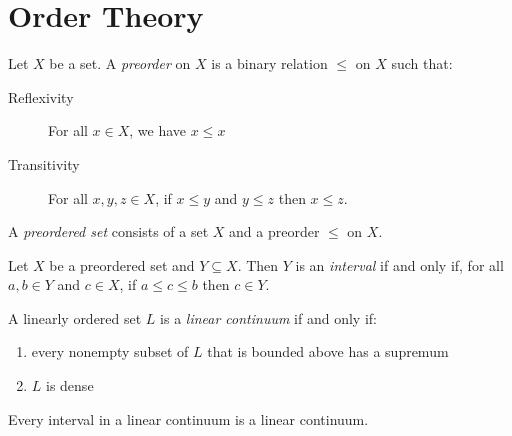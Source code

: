 \section{Order Theory}

\begin{definition}[Preorder]
    Let $X$ be a set. A \emph{preorder} on $X$ is a binary relation $\leq$ on $X$ such that:
    \begin{description}
        \item[Reflexivity] For all $x \in X$, we have $x \leq x$
        \item[Transitivity] For all $x, y, z \in X$, if $x \leq y$ and $y \leq z$ then $x \leq z$.  
    \end{description}
\end{definition}

\begin{definition}
    A \emph{preordered set} consists of a set $X$ and a preorder $\leq$ on $X$.
\end{definition}

\begin{definition}[Interval]
    Let $X$ be a preordered set and $Y \subseteq X$. Then $Y$ is an \emph{interval} if and only if, for
    all $a, b \in Y$ and $c \in X$, if $a \leq c \leq b$ then $c \in Y$.
\end{definition}

\begin{definition}
    A linearly ordered set $L$ is a \emph{linear continuum} if and only if:
    \begin{enumerate}
        \item every nonempty subset of $L$ that is bounded above has a supremum
        \item $L$ is dense
    \end{enumerate}
\end{definition}

\begin{proposition}
    Every interval in a linear continuum is a linear continuum.
\end{proposition}


